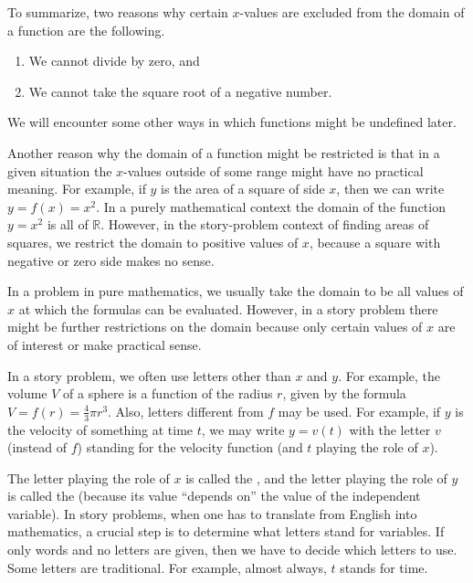 To summarize, two reasons why certain $x$-values are excluded from the
domain of a function are the following.

\begin{formulabox}
\begin{enumerate}
\item We cannot divide by zero, and 
\item We cannot take the square root of a negative number. 
\end{enumerate}
We will encounter some other ways in which functions might be undefined later.
\end{formulabox}

Another reason why the domain of a function might be restricted is
that in a given situation the $x$-values outside of some range might
have no practical meaning.  For example, if $y$ is the area of a
square of side $x$, then we can write $y=f(x)=x^2$.  In a purely
mathematical context the domain of the function $y=x^2$ is all of
$\mathbb{R}$. However, in the story-problem context of finding areas of squares,
we restrict the domain to positive values of $x$, because a square
with negative or zero side makes no sense.

In a problem in pure mathematics, we usually take the domain to be all
values of $x$ at which the formulas can be evaluated. However, in
a story problem there might be further restrictions on the domain
because only certain values of $x$ are of interest or make practical
sense.

In a story problem, we often use letters other than $x$ and $y$.
For example, the volume $V$ of a sphere is a function of the radius
$r$, given by the formula $V=f(r)=\frac{4}{3}\pi r^3$.
Also, letters different from $f$ may be used.  For example, if $y$ is
the velocity of something at time $t$, we may write $y=v(t)$ with
the letter $v$ (instead of $f$) standing for the velocity function (and
$t$ playing the role of $x$).

The letter playing the role of $x$ is called the , and the letter playing the role of $y$ is called the
 (because its
value ``depends on'' the value of the independent
variable).  In story problems, when one has to translate from English 
into mathematics, a crucial step is to
determine what letters stand for variables.  If only words and no
letters are given, then we have to decide which letters to use.  Some
letters are traditional.  For example, almost always, $t$ stands for
time.

